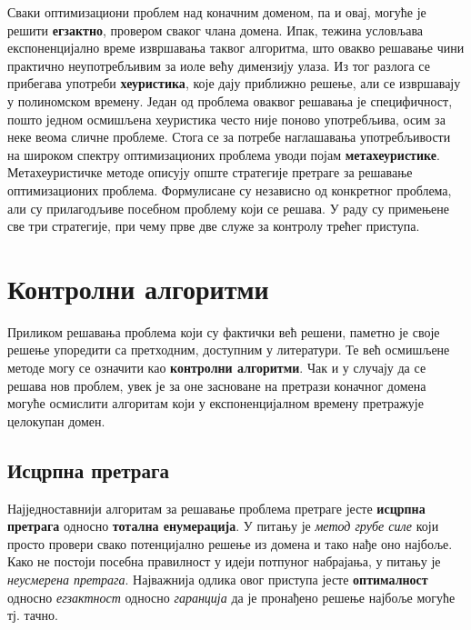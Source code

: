 \documentclass[a4paper]{article}
\begin{document}
Сваки оптимизациони проблем над коначним доменом, па и овај, могуће је решити \textbf{егзактно}, провером сваког члана домена. Ипак, тежина условљава експоненцијално време извршавања таквог алгоритма, што овакво решавање чини практично неупотребљивим за иоле већу димензију улаза. Из тог разлога се прибегава употреби \textbf{хеуристика}, које дају приближно решење, али се извршавају у полиномском времену. Један од проблема оваквог решавања је специфичност, пошто једном осмишљена хеуристика често није поново употребљива, осим за неке веома сличне проблеме. Стога се за потребе наглашавања употребљивости на широком спектру оптимизационих проблема уводи појам \textbf{метахеуристике}. Метахеуристичке методе описују опште стратегије претраге за решавање оптимизационих проблема. Формулисане су независно од конкретног проблема, али су прилагодљиве посебном проблему који се решава. У раду су примењене све три стратегије, при чему прве две служе за контролу трећег приступа.

\section{Контролни алгоритми}

Приликом решавања проблема који су фактички већ решени, паметно је своје решење упоредити са претходним, доступним у литератури. Те већ осмишљене методе могу се означити као \textbf{контролни алгоритми}. Чак и у случају да се решава нов проблем, увек је за оне засноване на претрази коначног домена могуће осмислити алгоритам који у експоненцијалном времену претражује целокупан домен.

\subsection{Исцрпна претрага}

Најједноставнији алгоритам за решавање проблема претраге јесте \textbf{исцрпна претрага} односно \textbf{тотална енумерација}. У питању је \textit{метод грубе силе} који просто провери свако потенцијално решење из домена и тако нађе оно најбоље. Како не постоји посебна правилност у идеји потпуног набрајања, у питању је \textit{неусмерена претрага}. Најважнија одлика овог приступа јесте \textbf{оптималност} односно \textit{егзактност} односно \textit{гаранција} да је пронађено решење најбоље могуће тј. тачно.
\end{document}

